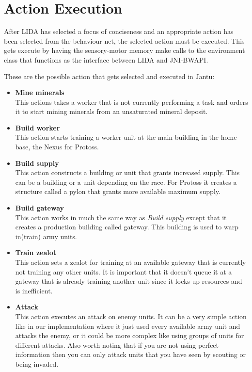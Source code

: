 \section{Action Execution}
\label{sec:actionexecution}
After LIDA has selected a focus of conciseness and an appropriate action has been selected from the behaviour net, the selected action must be executed. This gets execute by having the sensory-motor memory make calls to the environment class that functions as the interface between LIDA and JNI-BWAPI. 

These are the possible action that gets selected and executed in Jantu:
\begin{itemize}
\item \textbf{Mine minerals} \\
This actions takes a worker that is not currently performing a task and orders it to start mining minerals from an unsaturated mineral deposit.
\item \textbf{Build worker} \\
This action starts training a worker unit at the main building in the home base, the Nexus for Protoss. 
\item \textbf{Build supply} \\
This action constructs a building or unit that grants increased supply. This can be a building or a unit depending on the race. For Protoss it creates a structure called a pylon that grants more available maximum supply.  	
\item \textbf{Build gateway} \\
This action works in much the same way as {\em Build supply} except that it creates a production building called gateway. This building is used to warp in(train) army units. 
\item \textbf{Train zealot} \\
This action sets a zealot for training at an available gateway that is currently not training any other units. It is important that it doesn't queue it at a gateway that is already training another unit since it locks up resources and is inefficient. 
\item \textbf{Attack} \\ 
This action executes an attack on enemy units. It can be a very simple action like in our implementation where it just used every available army unit and attacks the enemy, or it could be more complex like using groups of units for different attacks. Also worth noting that if you are not using perfect information then you can only attack units that you have seen by scouting or being invaded. 
\end{itemize}

